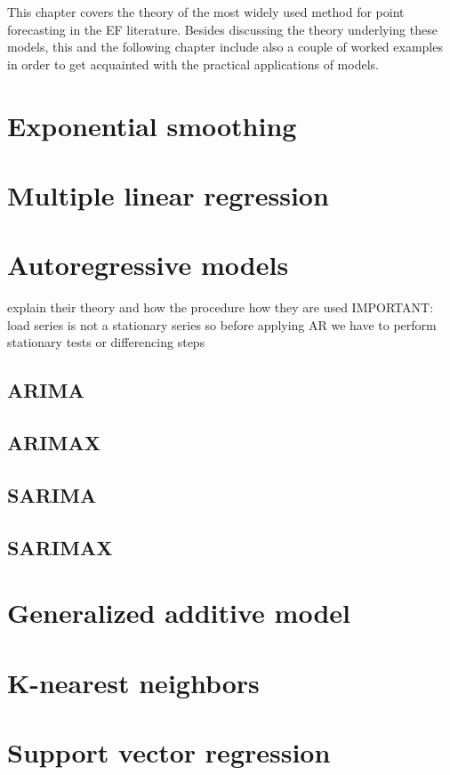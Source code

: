This chapter covers the theory of the most widely used method for point forecasting in the EF literature. Besides discussing the theory underlying these models, this and the following chapter include also a couple of worked examples in order to get acquainted with the practical applications of models.
\section{Exponential smoothing}

\section{Multiple linear regression}

\section{Autoregressive models}
explain their theory
and how the procedure how they are used
IMPORTANT: load series is not a stationary series so before applying AR we have to perform stationary tests or differencing steps
\subsection{ARIMA}
\subsection{ARIMAX}
\subsection{SARIMA}
\subsection{SARIMAX}

\section{Generalized additive model}

\section{K-nearest neighbors}

\section{Support vector regression}

